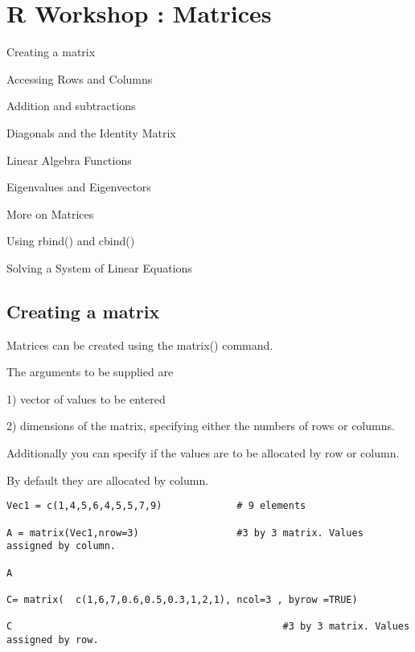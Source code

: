 

\section{R Workshop : Matrices}

Creating a matrix

Accessing Rows and Columns

Addition and subtractions

Diagonals and the Identity Matrix

Linear Algebra Functions

Eigenvalues and Eigenvectors

More on Matrices

Using rbind() and cbind()

Solving a System of Linear Equations

 

\subsection{Creating a matrix}


Matrices can be created using the matrix() command. 


The arguments to be supplied are 


    1) vector of values to be entered

    2) dimensions of the matrix, specifying either the numbers of rows or columns.


Additionally you can specify if the values are to be allocated by row or column. 

By default they are allocated by column.



\begin{framed}
\begin{verbatim}
Vec1 = c(1,4,5,6,4,5,5,7,9)             # 9 elements

A = matrix(Vec1,nrow=3)                 #3 by 3 matrix. Values assigned by column.

A

C= matrix(  c(1,6,7,0.6,0.5,0.3,1,2,1), ncol=3 , byrow =TRUE)

C                                               #3 by 3 matrix. Values assigned by row.

 \end{verbatim}
\end{framed}



